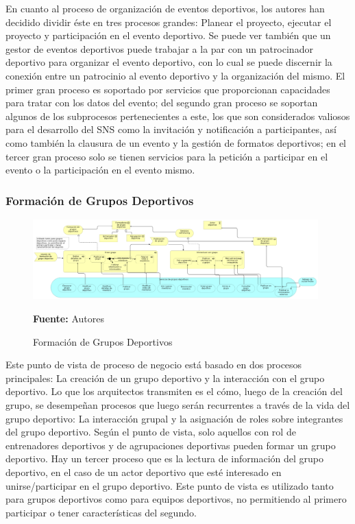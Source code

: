 En cuanto al proceso de organización de eventos deportivos, los autores han decidido dividir éste en tres procesos grandes: Planear el proyecto, ejecutar el proyecto y participación en el evento deportivo. Se puede ver también que un gestor de eventos deportivos puede trabajar a la par con un patrocinador deportivo para organizar el evento deportivo, con lo cual se puede discernir la conexión entre un patrocinio al evento deportivo y la organización del mismo. El primer gran proceso es soportado por servicios que proporcionan capacidades para tratar con los datos del evento; del segundo gran proceso se soportan algunos de los subprocesos pertenecientes a este, los que son considerados valiosos para el desarrollo del SNS como la invitación y notificación a participantes, así como también la clausura de un evento y la gestión de formatos deportivos; en el tercer gran proceso solo se tienen servicios para la petición a participar en el evento o la participación en el evento mismo.

\subsubsection{Formación de Grupos Deportivos}

\begin{figure}[!htb]
  \begin{center}
    \includegraphics[width=11cm]{./imagenes/business_process/formaciongruposdeportivos.png}
    \caption{Formación de Grupos Deportivos}
    \label{fig:bp_formacion_grupos_deportivos}
    \textbf{Fuente:}  Autores
  \end{center}
\end{figure}

Este punto de vista de proceso de negocio está basado en dos procesos principales: La creación de un grupo deportivo y la interacción con el grupo deportivo. Lo que los arquitectos transmiten es el cómo, luego de la creación del grupo, se desempeñan procesos que luego serán recurrentes a través de la vida del grupo deportivo: La interacción grupal y la asignación de roles sobre integrantes del grupo deportivo. Según el punto de vista, solo aquellos con rol de entrenadores deportivos y de agrupaciones deportivas pueden formar un grupo deportivo. Hay un tercer proceso que es la lectura de información del grupo deportivo, en el caso de un actor deportivo que esté interesado en unirse/participar en el grupo deportivo. Este punto de vista es utilizado tanto para grupos deportivos como para equipos deportivos, no permitiendo al primero participar o tener características del segundo.

